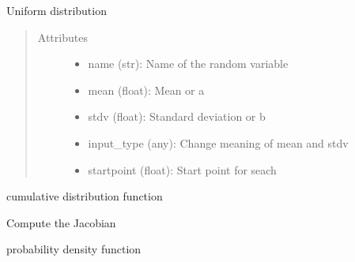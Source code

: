 \documentclass[letterpaper,10pt,english]{sphinxmanual}
\begin{document}
\begin{fulllineitems}
Uniform distribution
\begin{quote}\begin{description}
\item[{Attributes }] \leavevmode\begin{itemize}
\item {} 
name (str):   Name of the random variable

\item {} 
mean (float): Mean or a

\item {} 
stdv (float): Standard deviation or b

\item {} 
input\_type (any): Change meaning of mean and stdv

\item {} 
startpoint (float): Start point for seach

\end{itemize}

\end{description}\end{quote}


\begin{fulllineitems}
cumulative distribution function

\end{fulllineitems}



\begin{fulllineitems}
Compute the Jacobian

\end{fulllineitems}



\begin{fulllineitems}
probability density function

\end{fulllineitems}




\end{fulllineitems}
\end{document}
